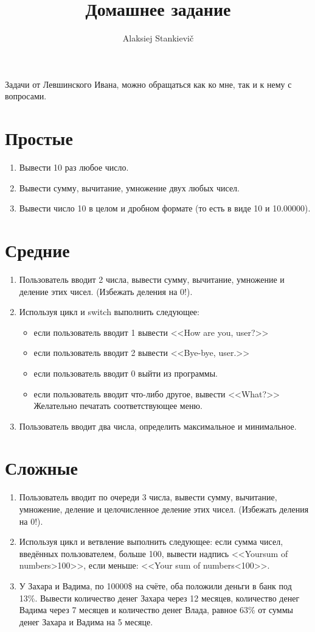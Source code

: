 \documentclass[12pt]{article}
\author{Alaksiej Stankievič}
\title{Домашнее задание}
\begin{document}


 Задачи от Левшинского Ивана, можно обращаться как ко мне, так и к нему с вопросами.
 \section*{Простые}
  \begin{enumerate}
   \item Вывести 10 раз любое число.
   \item Вывести сумму, вычитание, умножение двух любых чисел.
   \item Вывести число 10 в целом и дробном формате (то есть в виде 10 и 10.00000).
  \end{enumerate}
  
  \section*{Средние}
  \begin{enumerate}
   \item Пользователь вводит 2 числа, вывести сумму, вычитание, умножение и деление этих чисел. (Избежать деления на 0!).
   \item Используя цикл и switch  выполнить следующее:
    \begin{itemize}
     \item если пользователь вводит 1 вывести <<How are you, user?>>
     \item если пользователь вводит 2 вывести <<Bye-bye, user.>>
     \item если пользователь вводит 0 выйти из программы.
     \item если пользователь вводит что-либо другое, вывести <<What?>>
     Желательно печатать соответствующее меню.
    \end{itemize}
   \item Пользователь вводит два числа, определить максимальное и минимальное.
  \end{enumerate}
  
  \section*{Сложные}
  \begin{enumerate}
   \item Пользователь вводит по очереди 3 числа, вывести сумму, вычитание, умножение, деление и целочисленное деление этих чисел. (Избежать деления на 0!).
   \item Используя цикл и ветвление выполнить следующее: если сумма чисел, введённых пользователем, больше 100, вывести надпись <<Yoursum of numbers>100>>, если меньше: <<Your sum of numbers<100>>.
   \item У Захара и Вадима, по 10000\$ на счёте, оба положили деньги в банк под 13\%. Вывести количество денег Захара через 12 месяцев, количество денег Вадима через 7 месяцев и количество денег Влада, равное 63\% от суммы денег Захара и Вадима на 5 месяце.
  \end{enumerate}
\end{document}
